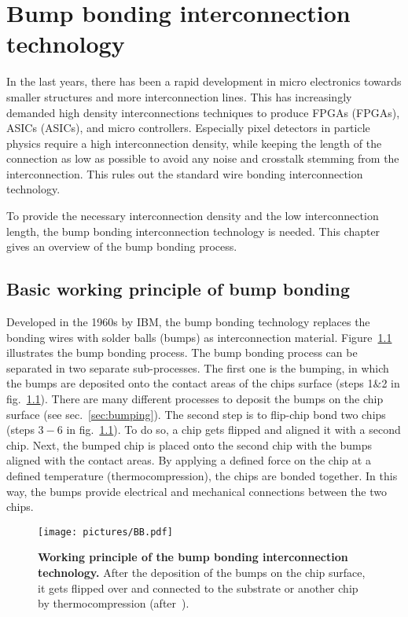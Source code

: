 \acresetall
\chapter{Bump bonding interconnection technology}\label{cha:bump_bonding}
In the last years, there has been a rapid development in micro electronics towards smaller structures and more interconnection lines. This has increasingly demanded high density interconnections techniques to produce \acl{FPGA}s (\acs{FPGA}s), \acl{ASIC}s (\acs{ASIC}s), and micro controllers. Especially pixel detectors in particle physics require a high interconnection density, while keeping the length of the connection as low as possible to avoid any noise and crosstalk stemming from the interconnection. This rules out the standard wire bonding interconnection technology.

To provide the necessary interconnection density and the low interconnection length, the bump bonding interconnection technology is needed. This chapter gives an overview of the bump bonding process.

\section{Basic working principle of bump bonding}
Developed in the 1960s by IBM, the bump bonding technology replaces the bonding wires with solder balls (bumps) as interconnection material. Figure~\ref{pic:bump_bonding_principle} illustrates the bump bonding process. The bump bonding process can be separated in two separate sub-processes. The first one is the bumping, in which the bumps are deposited onto the contact areas of the chips surface (steps 1$\&$2 in fig.~\ref{pic:bump_bonding_principle}). There are many different processes to deposit the bumps on the chip surface (see sec.~\ref{sec:bumping}). The second step is to flip-chip bond two chips (steps $3-6$ in fig.~\ref{pic:bump_bonding_principle}). To do so, a chip gets flipped and aligned it with a second chip. Next, the bumped chip is placed onto the second chip with the bumps aligned with the contact areas. By applying a defined force on the chip at a defined temperature (thermocompression), the chips are bonded together. In this way, the bumps provide electrical and mechanical connections between the two chips.
\begin{figure}
\begin{center}
\texttt{[image: pictures/BB.pdf]}
\end{center}
\caption[Working principle of bump bonding interconnection technology.]{\textbf{Working principle of the bump bonding interconnection technology.} After the deposition of the bumps on the chip surface, it gets flipped over and connected to the substrate or another chip by thermocompression (after~\cite{UCD14}).}\label{pic:bump_bonding_principle}
\end{figure}

